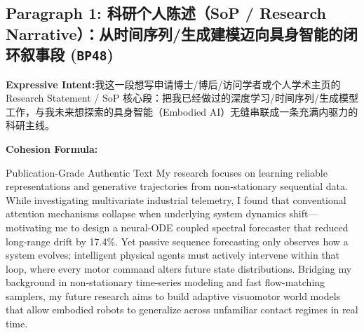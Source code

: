 \subsection*{Paragraph 1: 科研个人陈述（SoP / Research Narrative）：从时间序列/生成建模迈向具身智能的闭环叙事段 (\texttt{BP48})}
\noindent\textbf{Expressive Intent:}\enspace 我这一段想写申请博士/博后/访问学者或个人学术主页的 Research Statement / SoP 核心段：把我已经做过的深度学习/时间序列/生成模型工作，与我未来想探索的具身智能（Embodied AI）无缝串联成一条充满内驱力的科研主线。\par
\noindent\textbf{Cohesion Formula:}\par\vspace{4pt}
\begin{ExampleBox}{Publication-Grade Authentic Text}
My research focuses on learning reliable representations and generative trajectories from non-stationary sequential data. While investigating multivariate industrial telemetry, I found that conventional attention mechanisms collapse when underlying system dynamics shift---motivating me to design a neural-ODE coupled spectral forecaster that reduced long-range drift by 17.4\%. Yet passive sequence forecasting only observes how a system evolves; intelligent physical agents must actively intervene within that loop, where every motor command alters future state distributions. Bridging my background in non-stationary time-series modeling and fast flow-matching samplers, my future research aims to build adaptive visuomotor world models that allow embodied robots to generalize across unfamiliar contact regimes in real time.
\end{ExampleBox}
